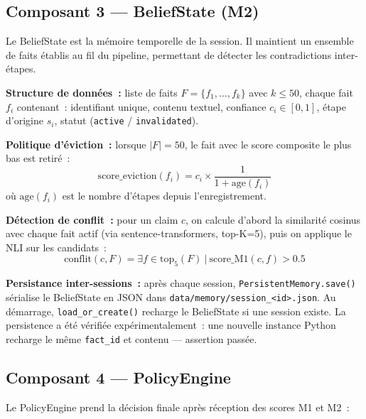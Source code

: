 \documentclass[12pt,a4paper]{article}
\begin{document}
\subsection{Composant 3 --- BeliefState (M2)}

Le BeliefState est la mémoire temporelle de la session. Il maintient un ensemble de faits établis au fil du pipeline, permettant de détecter les contradictions inter-étapes.

\textbf{Structure de données~:} liste de faits $F = \{f_1, \ldots, f_k\}$ avec $k \leq 50$, chaque fait $f_i$ contenant~: identifiant unique, contenu textuel, confiance $c_i \in [0,1]$, étape d'origine $s_i$, statut (\texttt{active} / \texttt{invalidated}).

\textbf{Politique d'éviction~:} lorsque $|F| = 50$, le fait avec le score composite le plus bas est retiré~:
\begin{equation}
\text{score\_eviction}(f_i) = c_i \times \frac{1}{1 + \text{age}(f_i)}
\label{eq:eviction}
\end{equation}
où $\text{age}(f_i)$ est le nombre d'étapes depuis l'enregistrement.

\textbf{Détection de conflit~:} pour un claim $c$, on calcule d'abord la similarité cosinus avec chaque fait actif (via sentence-transformers, top-K=5), puis on applique le NLI sur les candidats~:
\begin{equation}
\text{conflit}(c, F) = \exists f \in \text{top}_{5}(F) ~|~ \text{score\_M1}(c, f) > 0.5
\label{eq:conflict}
\end{equation}

\textbf{Persistance inter-sessions~:} après chaque session, \texttt{PersistentMemory.save()} sérialise le BeliefState en JSON dans \texttt{data/memory/session\_<id>.json}. Au démarrage, \texttt{load\_or\_create()} recharge le BeliefState si une session existe. La persistence a été vérifiée expérimentalement~: une nouvelle instance Python recharge le même \texttt{fact\_id} et contenu --- assertion passée.

\subsection{Composant 4 --- PolicyEngine}

Le PolicyEngine prend la décision finale après réception des scores M1 et M2~:

\begin{algorithm}[H]
\SetAlgoLined
{}
\caption{PolicyEngine --- algorithme de décision}
\label{alg:policy}
\end{algorithm}
\end{document}
